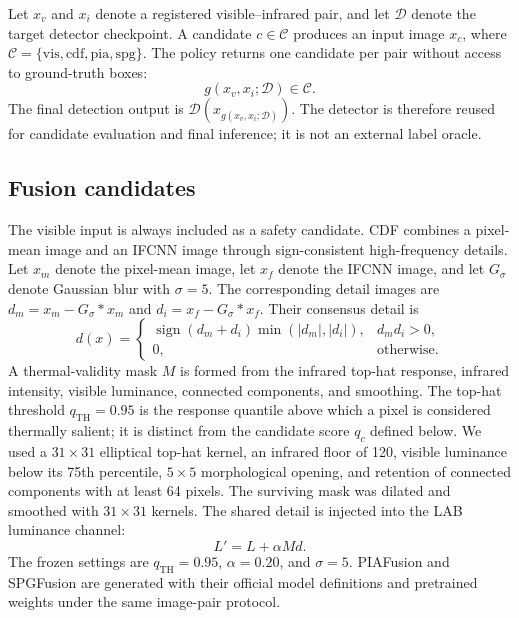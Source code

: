\documentclass[preprint,11pt]{elsarticle}
\begin{document}
Let \(x_v\) and \(x_i\) denote a registered visible--infrared pair, and let
\(\mathcal{D}\) denote the target detector checkpoint. A candidate
\(c\in\mathcal{C}\) produces an input image \(x_c\), where
\(\mathcal{C}=\{\mathrm{vis},\mathrm{cdf},\mathrm{pia},\mathrm{spg}\}\).
The policy returns one candidate per pair without access to ground-truth boxes:
\begin{equation}
g(x_v,x_i;\mathcal{D})\in\mathcal{C}.
\end{equation}
The final detection output is
\(\mathcal{D}(x_{g(x_v,x_i;\mathcal{D})})\). The detector is therefore reused
for candidate evaluation and final inference; it is not an external label
oracle.

\subsection{Fusion candidates}

The visible input is always included as a safety candidate. CDF combines a
pixel-mean image and an IFCNN image through sign-consistent high-frequency
details. Let \(x_m\) denote the pixel-mean image, let \(x_f\) denote the IFCNN
image, and let \(G_\sigma\) denote Gaussian blur with \(\sigma=5\). The
corresponding detail images are
\(d_m=x_m-G_\sigma*x_m\) and \(d_i=x_f-G_\sigma*x_f\). Their consensus detail
is
\begin{equation}
d(x)=
\begin{cases}
\operatorname{sign}(d_m+d_i)\min(|d_m|,|d_i|), & d_m d_i>0,\\
0, & \text{otherwise}.
\end{cases}
\end{equation}
A thermal-validity mask \(M\) is formed from the infrared top-hat response,
infrared intensity, visible luminance, connected components, and smoothing.
The top-hat threshold \(q_{\mathrm{TH}}=0.95\) is the response quantile above
which a pixel is considered thermally salient; it is distinct from the
candidate score \(q_c\) defined below. We used a \(31\times31\) elliptical
top-hat kernel, an infrared floor of 120, visible luminance below its 75th
percentile, \(5\times5\) morphological opening, and retention of connected
components with at least 64 pixels. The surviving mask was dilated and
smoothed with \(31\times31\) kernels.
The shared detail is injected into the LAB luminance channel:
\begin{equation}
L' = L + \alpha M d.
\end{equation}
The frozen settings are \(q_{\mathrm{TH}}=0.95\), \(\alpha=0.20\), and
\(\sigma=5\).
PIAFusion and SPGFusion are generated with their official model definitions and
pretrained weights under the same image-pair protocol.
\cite{zhang2020,tang2022,zhang2026}
\end{document}

